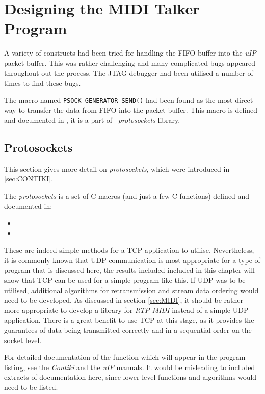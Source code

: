 \section{Designing the MIDI Talker Program}

  A variety of constructs had been tried for handling the
 FIFO  buffer into the \emph{uIP} packet buffer. This was
 rather challenging and many complicated bugs appeared
 throughout out the process. The JTAG debugger had been
 utilised a number of times to find these bugs.

  The macro named \texttt{PSOCK\_GENERATOR\_SEND()} had
 been found as the most direct way to transfer the data
 from FIFO into the packet buffer. This macro is defined
 and documented in , it is a part
 of \Contiki\ \emph{protosockets} library.

\subsection{Protosockets}

  This section gives more detail on \emph{protosockets},
 which were introduced in \ref{sec:CONTIKI}.

  The \emph{protosockets}  is a set of C macros (and just
 a few C functions) defined and documented in:
 \begin{itemize}	
	\item{}
	\item{}
 \end{itemize}

 These are indeed simple methods for a TCP application to
 utilise. Nevertheless, it is commonly known that UDP
 communication is most appropriate for a type of program
 that is discussed here, the results included included in
 this chapter will show that TCP can be used for a simple
 program like this. If UDP was to be utilised, additional
 algorithms for retransmission and stream data ordering
 would need to be developed. As discussed in section
 \ref{sec:MIDI}, it should be rather more appropriate to
 develop a library for \emph{RTP-MIDI} instead of a simple
 UDP application. There is a great benefit to use TCP at
 this stage, as it provides the guarantees of data being
 transmitted correctly and in a sequential order on the
 socket level.

 For detailed documentation of the function which will
 appear in the program listing, see the \emph{Contiki}
 \cite{contik:docs} and the \emph{uIP} \cite{contik:uip}
 manuals. It would be misleading to included extracts
 of documentation here, since lower-level functions
 and algorithms would need to be listed.

